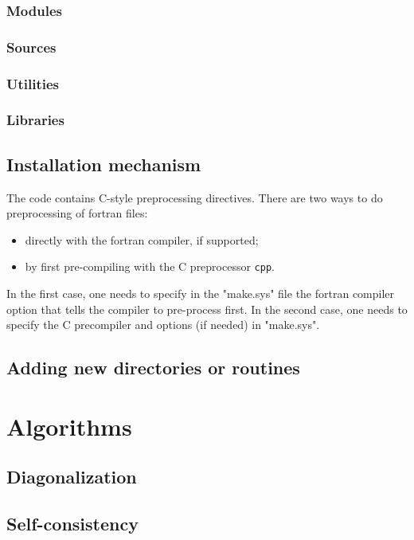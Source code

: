 \documentclass[12pt,a4paper]{article}
\begin{document}
\subsubsection{Modules}

\subsubsection{Sources}

\subsubsection{Utilities}

\subsubsection{Libraries}

\subsection{Installation mechanism}

The code contains C-style preprocessing directives. 
There are two ways to do preprocessing of fortran files:
\begin{itemize}
  \item directly with the fortran compiler, if supported;
  \item by first pre-compiling with the C preprocessor {\tt cpp}.
\end{itemize}
In the first case, one needs to specify in the "make.sys" file the
fortran compiler option that tells the compiler 
to pre-process first. In the second case, one needs to 
specify the C precompiler and options (if needed) in "make.sys".

\subsection{Adding new directories or routines}

\section{Algorithms}

\subsection{Diagonalization}

\subsection{Self-consistency}
\end{document}
